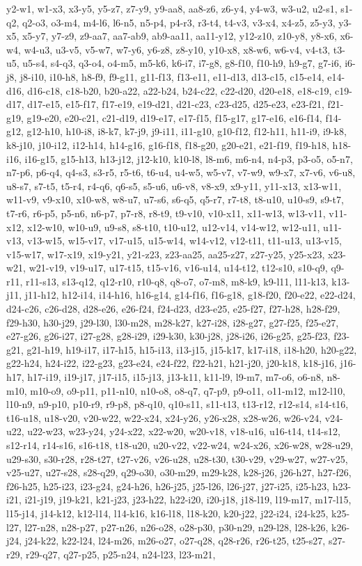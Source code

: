 y2-w1, w1-x3, x3-y5, y5-z7, z7-y9, y9-aa8, aa8-z6, z6-y4, y4-w3, w3-u2, u2-s1, s1-q2, q2-o3, o3-m4, m4-l6, l6-n5, n5-p4, p4-r3, r3-t4, t4-v3, v3-x4, x4-z5, z5-y3, y3-x5, x5-y7, y7-z9, z9-aa7, aa7-ab9, ab9-aa11, aa11-y12, y12-z10, z10-y8, y8-x6, x6-w4, w4-u3, u3-v5, v5-w7, w7-y6, y6-z8, z8-y10, y10-x8, x8-w6, w6-v4, v4-t3, t3-u5, u5-s4, s4-q3, q3-o4, o4-m5, m5-k6, k6-i7, i7-g8, g8-f10, f10-h9, h9-g7, g7-i6, i6-j8, j8-i10, i10-h8, h8-f9, f9-g11, g11-f13, f13-e11, e11-d13, d13-c15, c15-e14, e14-d16, d16-c18, c18-b20, b20-a22, a22-b24, b24-c22, c22-d20, d20-e18, e18-c19, c19-d17, d17-e15, e15-f17, f17-e19, e19-d21, d21-c23, c23-d25, d25-e23, e23-f21, f21-g19, g19-e20, e20-c21, c21-d19, d19-e17, e17-f15, f15-g17, g17-e16, e16-f14, f14-g12, g12-h10, h10-i8, i8-k7, k7-j9, j9-i11, i11-g10, g10-f12, f12-h11, h11-i9, i9-k8, k8-j10, j10-i12, i12-h14, h14-g16, g16-f18, f18-g20, g20-e21, e21-f19, f19-h18, h18-i16, i16-g15, g15-h13, h13-j12, j12-k10, k10-l8, l8-m6, m6-n4, n4-p3, p3-o5, o5-n7, n7-p6, p6-q4, q4-s3, s3-r5, r5-t6, t6-u4, u4-w5, w5-v7, v7-w9, w9-x7, x7-v6, v6-u8, u8-s7, s7-t5, t5-r4, r4-q6, q6-s5, s5-u6, u6-v8, v8-x9, x9-y11, y11-x13, x13-w11, w11-v9, v9-x10, x10-w8, w8-u7, u7-s6, s6-q5, q5-r7, r7-t8, t8-u10, u10-s9, s9-t7, t7-r6, r6-p5, p5-n6, n6-p7, p7-r8, r8-t9, t9-v10, v10-x11, x11-w13, w13-v11, v11-x12, x12-w10, w10-u9, u9-s8, s8-t10, t10-u12, u12-v14, v14-w12, w12-u11, u11-v13, v13-w15, w15-v17, v17-u15, u15-w14, w14-v12, v12-t11, t11-u13, u13-v15, v15-w17, w17-x19, x19-y21, y21-z23, z23-aa25, aa25-z27, z27-y25, y25-x23, x23-w21, w21-v19, v19-u17, u17-t15, t15-v16, v16-u14, u14-t12, t12-s10, s10-q9, q9-r11, r11-s13, s13-q12, q12-r10, r10-q8, q8-o7, o7-m8, m8-k9, k9-l11, l11-k13, k13-j11, j11-h12, h12-i14, i14-h16, h16-g14, g14-f16, f16-g18, g18-f20, f20-e22, e22-d24, d24-c26, c26-d28, d28-e26, e26-f24, f24-d23, d23-e25, e25-f27, f27-h28, h28-f29, f29-h30, h30-j29, j29-l30, l30-m28, m28-k27, k27-i28, i28-g27, g27-f25, f25-e27, e27-g26, g26-i27, i27-g28, g28-i29, i29-k30, k30-j28, j28-i26, i26-g25, g25-f23, f23-g21, g21-h19, h19-i17, i17-h15, h15-i13, i13-j15, j15-k17, k17-i18, i18-h20, h20-g22, g22-h24, h24-i22, i22-g23, g23-e24, e24-f22, f22-h21, h21-j20, j20-k18, k18-j16, j16-h17, h17-i19, i19-j17, j17-i15, i15-j13, j13-k11, k11-l9, l9-m7, m7-o6, o6-n8, n8-m10, m10-o9, o9-p11, p11-n10, n10-o8, o8-q7, q7-p9, p9-o11, o11-m12, m12-l10, l10-n9, n9-p10, p10-r9, r9-p8, p8-q10, q10-s11, s11-t13, t13-r12, r12-s14, s14-t16, t16-u18, u18-v20, v20-w22, w22-x24, x24-y26, y26-x28, x28-w26, w26-v24, v24-u22, u22-w23, w23-y24, y24-x22, x22-w20, w20-v18, v18-u16, u16-t14, t14-s12, s12-r14, r14-s16, s16-t18, t18-u20, u20-v22, v22-w24, w24-x26, x26-w28, w28-u29, u29-s30, s30-r28, r28-t27, t27-v26, v26-u28, u28-t30, t30-v29, v29-w27, w27-v25, v25-u27, u27-s28, s28-q29, q29-o30, o30-m29, m29-k28, k28-j26, j26-h27, h27-f26, f26-h25, h25-i23, i23-g24, g24-h26, h26-j25, j25-l26, l26-j27, j27-i25, i25-h23, h23-i21, i21-j19, j19-k21, k21-j23, j23-h22, h22-i20, i20-j18, j18-l19, l19-m17, m17-l15, l15-j14, j14-k12, k12-l14, l14-k16, k16-l18, l18-k20, k20-j22, j22-i24, i24-k25, k25-l27, l27-n28, n28-p27, p27-n26, n26-o28, o28-p30, p30-n29, n29-l28, l28-k26, k26-j24, j24-k22, k22-l24, l24-m26, m26-o27, o27-q28, q28-r26, r26-t25, t25-s27, s27-r29, r29-q27, q27-p25, p25-n24, n24-l23, l23-m21, 